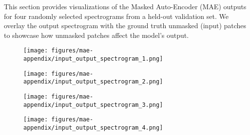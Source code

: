This section provides visualizations of the Masked Auto-Encoder (MAE) outputs for four randomly selected spectrograms from a held-out validation set. We overlay the output spectrogram with the ground truth unmasked (input) patches to showcase how unmasked patches affect the model's output. 

\begin{figure}[h!]
    \centering
    \texttt{[image: figures/mae-appendix/input\_output\_spectrogram\_1.png]}
    \label{fig:mae-1}
\end{figure}

\begin{figure}[h!]
    \centering
    \texttt{[image: figures/mae-appendix/input\_output\_spectrogram\_2.png]}
    \label{fig:mae-2}
\end{figure}

\begin{figure}[h!]
    \centering
    \texttt{[image: figures/mae-appendix/input\_output\_spectrogram\_3.png]}
    \label{fig:mae-3}
\end{figure}

\begin{figure}[h!]
    \centering
    \texttt{[image: figures/mae-appendix/input\_output\_spectrogram\_4.png]}
    \label{fig:mae-4}
\end{figure}